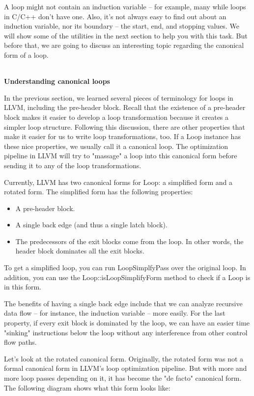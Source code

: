 A loop might not contain an induction variable – for example, many while loops in C/C++ don't have one. Also, it's not always easy to find out about an induction variable, nor its boundary – the start, end, and stopping values. We will show some of the utilities in the next section to help you with this task. But before that, we are going to discuss an interesting topic regarding the canonical form of a loop.

\hspace*{\fill} \\ %
\noindent
\textbf{Understanding canonical loops}

In the previous section, we learned several pieces of terminology for loops in LLVM, including the pre-header block. Recall that the existence of a pre-header block makes it easier to develop a loop transformation because it creates a simpler loop structure. Following this discussion, there are other properties that make it easier for us to write loop transformations, too. If a Loop instance has these nice properties, we usually call it a canonical loop. The optimization pipeline in LLVM will try to "massage" a loop into this canonical form before sending it to any of the loop transformations.

Currently, LLVM has two canonical forms for Loop: a simplified form and a rotated form. The simplified form has the following properties:

\begin{itemize}
\item A pre-header block.
\item A single back edge (and thus a single latch block).
\item The predecessors of the exit blocks come from the loop. In other words, the header block dominates all the exit blocks.
\end{itemize}

To get a simplified loop, you can run LoopSimplfyPass over the original loop. In addition, you can use the Loop::isLoopSimplifyForm method to check if a Loop is in this form.

The benefits of having a single back edge include that we can analyze recursive data flow – for instance, the induction variable – more easily. For the last property, if every exit block is dominated by the loop, we can have an easier time "sinking" instructions below the loop without any interference from other control flow paths.

Let's look at the rotated canonical form. Originally, the rotated form was not a formal canonical form in LLVM's loop optimization pipeline. But with more and more loop passes depending on it, it has become the "de facto" canonical form. The following diagram shows what this form looks like:

